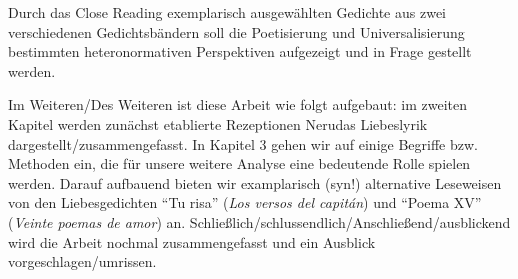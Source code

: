 \begin{comment}
  [Kolodny1980]
  feministische literaturkritik wird anscheinend zur sau gemacht, weil sie kein system/program hat: "lack of systematic coherence"
  das ist auch gleichzeitig die stärke der bewegung: diversity, pluralism
  ``All the feminist is asserting, then, is her own equivalent
  right to liberate new (and perhaps different) significances from
  these same texts; and, at the same time, her right to choose which
  features of a text she takes as relevant because she is, after all, ask-
  ing new and different questions of it.''~\autocite{Kolodny1980}
  ``Robert Scholes, from whom I've been quoting, goes so far as to assert
  that "there is no single 'right' reading for any complex literary
  work,"''
  ``we entertain the possibility
  that different readings, even of the same text, may be differently
  useful, even illuminating, within different contexts of inquiry.''
  ``what we give up is simply the arrogance of
  claiming that our work is either exhaustive or definitive.''
  ``If feminist criticism calls anything into
  question, it must be that dog-eared myth of intellectual neutrality.''
\end{comment}

\begin{comment}
  * literatur/sprache shape our minds
  * wachsamkeit/Sensibilität schaffen fürs Erkennen patriarchalischen Projekte, die mittels "universelle Gefühle", "schöne Liebeslyrik" vermittelt werden/dafür verkauft werden

  immer noch zu schwammig..

  [Kolodny1980]
  Feminist Readings of male authors: discovering/exposing power relations men-women, that are taken for natural and granted
\end{comment}


Durch das Close Reading exemplarisch ausgewählten Gedichte aus zwei verschiedenen Gedichtsbändern soll die Poetisierung und Universalisierung bestimmten heteronormativen Perspektiven aufgezeigt und in Frage gestellt werden.

Im Weiteren/Des Weiteren ist diese Arbeit wie folgt aufgebaut: im zweiten Kapitel werden zunächst etablierte Rezeptionen Nerudas Liebeslyrik dargestellt/zusammengefasst.
In Kapitel 3 gehen wir auf einige Begriffe bzw. Methoden ein, die für unsere weitere Analyse eine bedeutende Rolle spielen werden.
Darauf aufbauend bieten wir examplarisch (syn!) alternative Leseweisen von den Liebesgedichten ``Tu risa'' (\textit{Los versos del capitán}) und ``Poema XV'' (\textit{Veinte poemas de amor}) an.
Schließlich/schlussendlich/Anschließend/ausblickend wird die Arbeit nochmal zusammengefasst und ein Ausblick vorgeschlagen/umrissen.

